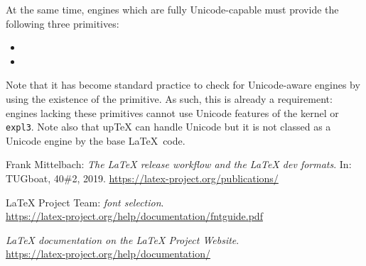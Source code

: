 \documentclass{ltnews}
\providecommand\pkg[1]{\texttt{#1}}
\begin{document}
At the same time, engines which are fully Unicode-capable must provide
the following three primitives:

\vspace{-\smallskipamount}
\begingroup\setlength\columnsep{0pt}
\begin{multicols}{2}
\fontsize{9.3}{11.3}\selectfont
\begin{itemize}
  \item {}
  \quad \textbullet{}\hspace{\labelsep}
  \item {}
\end{itemize}
\end{multicols}
\vspace{-\smallskipamount}
\endgroup
%
Note that it has become standard practice to check for Unicode-aware engines
by using the existence of the  primitive. As such, this is already
a requirement: engines lacking these primitives cannot use Unicode features
of the \LaTeXe{} kernel or \pkg{expl3}. Note also that up\TeX{} can
handle Unicode but it is not classed as a Unicode engine by the
base \LaTeX\ code.

\enlargethispage*{\baselineskip}
\vspace{3.9pt}               %


\begin{thebibliography}{9}

\fontsize{9.3}{11.3}\selectfont

 Frank Mittelbach:
  \emph{The
  \LaTeX{} release workflow and the \LaTeX{} dev formats}.
  In: TUGboat, 40\#2, 2019.
  \url{https://latex-project.org/publications/}

 \LaTeX{} Project Team:
  \emph{\LaTeXe{} font selection}.\\
  \url{https://latex-project.org/help/documentation/fntguide.pdf}

  \emph{\LaTeX{} documentation on the \LaTeX{} Project Website}.\\
  \url{https://latex-project.org/help/documentation/}

\end{thebibliography}
\end{document}

